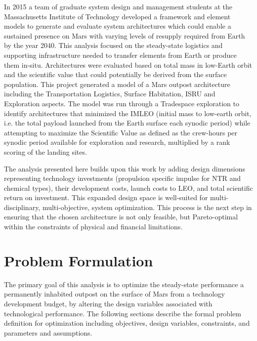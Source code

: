 \documentclass[]{aiaa-pretty}
\begin{document}
In 2015 a team of graduate system design and management students at the Massachusetts Institute of Technology developed a framework and element models to generate and evaluate system architectures which could enable a sustained presence on Mars with varying levels of resupply required from Earth by the year 2040. This analysis focused on the steady-state logistics and supporting infrastructure needed to transfer elements from Earth or produce them in-situ. Architectures were evaluated based on total mass in low-Earth orbit and the scientific value that could potentially be derived from the surface population. This project generated a model of a Mars outpost architecture including the Transportation Logistics, Surface Habitation, ISRU and Exploration aspects. The model was run through a Tradespace exploration to identify architectures that minimized the IMLEO (initial mass to low-earth orbit, i.e. the total payload launched from the Earth surface each synodic period) while attempting to maximize the Scientific Value as defined as the crew-hours per synodic period available for exploration and research, multiplied by a rank scoring of the landing sites.

The analysis presented here builds upon this work by adding design dimensions representing technology investments (propulsion specific impulse for NTR and chemical types), their development costs, launch costs to LEO, and total scientific return on investment. This expanded design space is well-suited for multi-disciplinary, multi-objective, system optimization. This process is the next step in ensuring that the chosen architecture is not only feasible, but Pareto-optimal within the constraints of physical and financial limitations. 

\section{Problem Formulation}  
\label{sec:formulation}
The primary goal of this analysis is to optimize the steady-state performance a permanently inhabited outpost on the surface of Mars from a technology development budget, by altering the design variables associated with technological performance. The following sections describe the formal problem definition for optimization including objectives, design variables, constraints, and parameters and assumptions.
\end{document}
